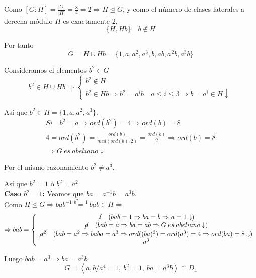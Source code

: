 \documentclass{article}
\begin{document}
\begin{enumerate}[(1)]
Como $\left[G:H\right]=\frac{|G|}{|H|}=\frac{8}{4}=2\Rightarrow H\unlhd G$, y como el número de clases laterales a derecha módulo $H$ es exactamente 2,
\begin{equation*}
\{H,Hb\}\quad b\notin H
\end{equation*}

Por tanto 
\begin{equation*}
G=H\cup Hb=\{1,a,a^2,a^3,b,ab,a^2b,a^3b\}
\end{equation*}

Consideramos el elementos $b^2\in G$
\begin{equation*}
b^2\in H\cup Hb\Rightarrow \left\lbrace\begin{array}{c}
b^2\notin H\\
b^2\in Hb\Rightarrow b^2=a^ib\quad a\leq i\leq 3\Rightarrow b=a^i\in H\downarrow
\end{array}\right.
\end{equation*}

Así que $b^2\in H=\{1,a,a^2,a^3\}$. 
\begin{gather*}
Si\quad b^2=a\Rightarrow ord(b^2)=4\Rightarrow ord(b)=8\\
4=ord(b^2)=\frac{ord(b)}{mcd(ord(b),2)}=\frac{ord(b)}{2}\Rightarrow ord(b)=8\\
\Rightarrow G\:es\:abeliano \downarrow
\end{gather*}

Por el mismo razonamiento $b^2\neq a^3$.

Así que $b^2=1$ ó $b^2=a^2$.\\

\textbf{Caso $b^2=1$:} Veamos que $ba=a^{-1}b=a^3b$. \\
Como $H\unlhd G\Rightarrow bab^{-1}\overset{b^2=1}{=}bab\in H\Rightarrow$
\begin{gather*}
\Rightarrow bab=\left\lbrace \begin{array}{c}
\cancel{1}\quad (bab=1\Rightarrow ba=b\Rightarrow a=1\downarrow)\\
\cancel{a}\quad (bab=a\Rightarrow ba=ab\Rightarrow G\:es\:abeliano\downarrow)\\
\cancel{a^2}\quad (bab=a^2\Rightarrow baba=a^3\Rightarrow ord((ba)^2)=ord(a^3)=4\Rightarrow ord(ba)=8\downarrow)\\
a^3
\end{array}\right.
\end{gather*}

Luego $bab=a^3\Rightarrow ba=a^3b$
\begin{equation*}
G=\left\langle a,b/a^4=1,\:b^2=1,\:ba=a^3b\right\rangle\overset{\sim}{=} D_4
\end{equation*}


\end{enumerate}
\end{document}
